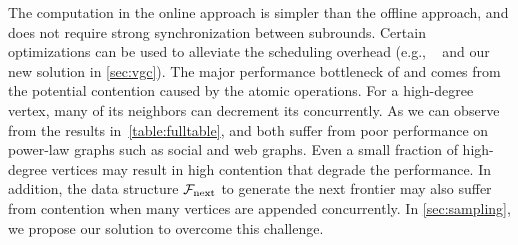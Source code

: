 The computation in the online approach is simpler than the offline approach, and does not require strong synchronization between subrounds.   
Certain optimizations can be used to alleviate the scheduling overhead (e.g., \PKC{}~\cite{kabir2017parallel} and our new solution in \cref{sec:vgc}). 
The major performance bottleneck of \park{} and \pkc{} comes from the potential contention caused by the atomic operations. 
For a high-degree vertex, many of its neighbors can decrement its \induceddegree{} concurrently. 
As we can observe from the results in~\cref{table:fulltable}, \park{} and \pkc{} both suffer from poor performance on power-law graphs such as social and web graphs. 
Even a small fraction of high-degree vertices may result in high contention that degrade the performance. 
In addition, the data structure $\mathcal{F}_{\text{next}}$ to generate the next frontier may also suffer from contention when many vertices are appended concurrently. 
In \cref{sec:sampling}, we propose our solution to overcome this challenge.





































